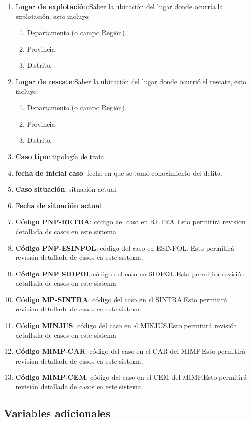 \documentclass{article}
\begin{document}
\begin{enumerate}
\item {\bf Lugar de explotación}:Saber la ubicación del lugar donde ocurría la explotación, esto incluye:
  \begin{enumerate}
  \item Departamento (o campo Región).
  \item Provincia.
  \item Distrito.
  \end{enumerate}
\item {\bf Lugar de rescate}:Saber la ubicación del lugar donde ocurrió el rescate, esto incluye:
  \begin{enumerate}
  \item Departamento (o campo Región).
  \item Provincia.
  \item Distrito.
  \end{enumerate}
\item {\bf Caso tipo}: tipología de trata. 
\item {\bf fecha de inicial caso}: fecha en que se tomó conocimiento del delito.
\item {\bf Caso situación}: situación actual.
\item {\bf Fecha de situación actual}
\item {\bf Código PNP-RETRA}: código del caso en RETRA Esto permitirá revisión detallada de casos en este sistema.
\item {\bf Código PNP-ESINPOL}: código del caso en ESINPOL. Esto permitirá revisión detallada de casos en este sistema.
\item {\bf Código PNP-SIDPOL}:código del caso en SIDPOL.Esto permitirá revisión detallada de casos en este sistema.
\item {\bf Código MP-SINTRA}: código del caso en el SINTRA.Esto permitirá revisión detallada de casos en este sistema.
\item {\bf Código MINJUS}: código del caso en el MINJUS.Esto permitirá revisión detallada de casos en este sistema.
\item {\bf Código MIMP-CAR}: código del caso en el CAR del MIMP.Esto permitirá revisión detallada de casos en este sistema.
\item {\bf Código MIMP-CEM}: código del caso en el CEM del MIMP.Esto permitirá revisión detallada de casos en este sistema.

\end{enumerate}

\subsection{Variables adicionales}
\end{document}
